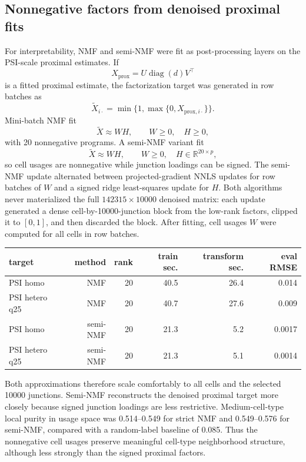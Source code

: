 \documentclass[11pt]{article}
\begin{document}
\subsection{Nonnegative factors from denoised proximal fits}

For interpretability, NMF and semi-NMF were fit as post-processing layers on
the PSI-scale proximal estimates.  If
\[
X_{\mathrm{prox}}=U\operatorname{diag}(d)V^\top
\]
is a fitted proximal estimate, the factorization target was generated in row
batches as
\[
\widetilde X_{i\cdot}
=
\min\{1,\max\{0, X_{\mathrm{prox},i\cdot}\}\}.
\]
Mini-batch NMF fit
\[
\widetilde X \approx WH,\qquad W\ge 0,\quad H\ge 0,
\]
with 20 nonnegative programs.  A semi-NMF variant fit
\[
\widetilde X \approx WH,\qquad W\ge 0,\quad H\in\mathbb{R}^{20\times p},
\]
so cell usages are nonnegative while junction loadings can be signed.  The
semi-NMF update alternated between projected-gradient NNLS updates for row
batches of \(W\) and a signed ridge least-squares update for \(H\).  Both
algorithms never materialized the full
\(142315\times 10000\) denoised matrix: each update generated a dense
cell-by-10000-junction block from the low-rank factors, clipped it to
\([0,1]\), and then discarded the block.  After fitting, cell usages \(W\) were
computed for all cells in row batches.

\begin{center}
\begin{tabular}{lrrrrr}
\toprule
target & method & rank & train sec. & transform sec. & eval RMSE\\
\midrule
PSI homo & NMF & 20 & 40.5 & 26.4 & 0.014\\
PSI hetero q25 & NMF & 20 & 40.7 & 27.6 & 0.009\\
PSI homo & semi-NMF & 20 & 21.3 & 5.2 & 0.0017\\
PSI hetero q25 & semi-NMF & 20 & 21.3 & 5.1 & 0.0014\\
\bottomrule
\end{tabular}
\end{center}

Both approximations therefore scale comfortably to all cells and the selected
10000 junctions.  Semi-NMF reconstructs the denoised proximal target more
closely because signed junction loadings are less restrictive.  Medium-cell-type
local purity in usage space was 0.514--0.549 for strict NMF and 0.549--0.576
for semi-NMF, compared with a random-label baseline of 0.085.  Thus the
nonnegative cell usages preserve meaningful cell-type neighborhood structure,
although less strongly than the signed proximal factors.
\end{document}
